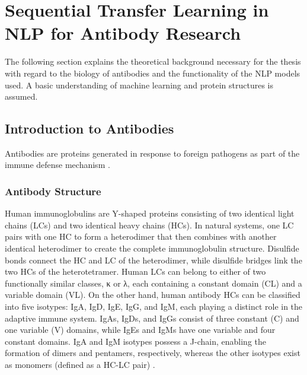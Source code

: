 \chapter{Sequential Transfer Learning in NLP for Antibody Research} \label{theorie}


The following section explains the theoretical background necessary for the thesis with regard to the biology of antibodies and the functionality of the NLP models used. A basic understanding of machine learning and protein structures is assumed.

\section{Introduction to Antibodies}

Antibodies are proteins generated in response to foreign pathogens as part of the immune defense mechanism \citep{Graves2020}.

\subsection{Antibody Structure}

Human immunoglobulins are Y-shaped proteins consisting of two identical light chains (LCs) and two identical heavy chains (HCs). In natural systems, one LC pairs with one HC to form a heterodimer that then combines with another identical heterodimer to create the complete immunoglobulin structure. Disulfide bonds connect the HC and LC of the heterodimer, while disulfide bridges link the two HCs of the heterotetramer. Human LCs can belong to either of two functionally similar classes, κ or λ, each containing a constant domain (CL) and a variable domain (VL). On the other hand, human antibody HCs can be classified into five isotypes: IgA, IgD, IgE, IgG, and IgM, each playing a distinct role in the adaptive immune system. IgAs, IgDs, and IgGs consist of three constant (C) and one variable (V) domains, while IgEs and IgMs have one variable and four constant domains. IgA and IgM isotypes possess a J-chain, enabling the formation of dimers and pentamers, respectively, whereas the other isotypes exist as monomers (defined as a HC-LC pair) \citep{Chiu2019}.

